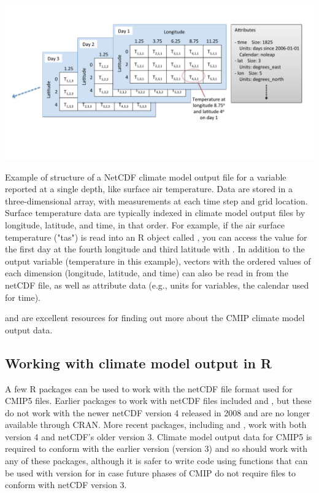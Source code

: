 \begin{widefigure}
\begin{center}
\includegraphics[width = \textwidth]{netcdf_figure}
\end{center}
\caption{Example of structure of a NetCDF climate model output file for a variable reported at a single depth, like surface air temperature. Data are stored in a three-dimensional array, with measurements at each time step and grid location. Surface temperature data are typically indexed in climate model output files by longitude, latitude, and time, in that order. For example, if the air surface temperature ("tas") is read into an R object called , you can access the value for the first day at the fourth longitude and third latitude with . In addition to the output variable (temperature in this example), vectors with the ordered values of each dimension (longitude, latitude, and time) can also be read in from the netCDF file, as well as attribute data (e.g., units for variables, the calendar used for time).}
\label{fig:netcdfexample}
\end{widefigure}

\citet{taylor2012overview} and \citet{meehl2007wcrp} are excellent
resources for finding out more about the CMIP climate model output data.

\subsection{Working with climate model output in
R}\label{working-with-climate-model-output-in-r}

A few R packages can be used to work with the netCDF file format used
for CMIP5 files. Earlier packages to work with netCDF files included
 and , but these do not work with the newer netCDF
version 4 released in 2008 and are no longer available through CRAN.
More recent packages, including  \citep{ncdf4} and
 \citep{michna2013rnetcdf, RNetCDF}, work with both version
4 and netCDF's older version 3. Climate model output data for CMIP5 is
required to conform with the earlier version (version 3)
\citep{taylor2010cmip5} and so should work with any of these packages,
although it is safer to write code using functions that can be used with
version for in case future phases of CMIP do not require files to
conform with netCDF version 3.


